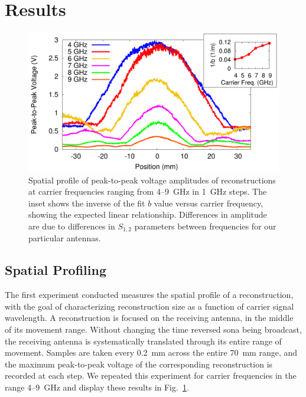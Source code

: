 \section{Results}


\begin{figure}[t!]
\includegraphics[width=\columnwidth]{figs/freq_profile.pdf}
\caption{Spatial profile of peak-to-peak voltage amplitudes of reconstructions 
at carrier frequencies ranging from \numrange{4}{9}~GHz in 1~GHz
steps. The inset shows the inverse of the fit $b$ value versus carrier
frequency, showing the expected linear relationship. Differences in amplitude
are due to differences in $S_{1,2}$ parameters between frequencies for our particular antennas.}
\label{fig:freq_profile}
\end{figure}


\subsection{Spatial Profiling}
\label{sec:spatial}

The first experiment conducted measures the spatial profile of a reconstruction,
with the goal of characterizing reconstruction size as a function of carrier
signal wavelength.
%
A reconstruction is focused on the receiving antenna, in the middle of its
movement range.
%
Without changing the time reversed sona being broadcast, the receiving antenna
is systematically translated through its entire range of movement.
%
Samples are taken every 0.2~mm across the entire 70~mm range, and the
maximum peak-to-peak voltage of the corresponding reconstruction is recorded at
each step.
%
We repeated this experiment for carrier frequencies in the range
\numrange{4}{9}~GHz and display these results in Fig.~\ref{fig:freq_profile}.



